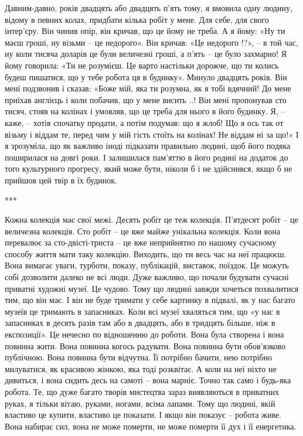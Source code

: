 Давним-давно, років двадцять або двадцять п'ять тому, я вмовила одну людину,
відому в певних колах, придбати кілька робіт у мене. Для себе, для свого
інтер'єру. Він чинив опір, він кричав, що це йому не треба. А я йому: «Ну ти
маєш гроші, ну візьми – це недорого». Він кричав: «Це недорого !?», – в той
час, ну коли тисяча доларів це були величезні гроші, а п'ять – це було
захмарно! Я йому говорила: «Ти не розумієш. Це варто настільки дорожче, що ти
колись будеш пишатися, що у тебе робота ця в будинку». Минуло двадцять років.
Він мені подзвонив і сказав: «Боже мій, яка ти розумна, як я тобі вдячний! До
мене приїхав англієць і коли побачив, що у мене висить ..! Він мені пропонував
сто тисяч, стояв на колінах і умовляв, що це треба для нього в його будинку. Я,
– каже, – хотів спочатку продати, а потім подумав: що я жлоб! Що я ось так от
візьму і віддам те, перед чим у мій гість стоїть на колінах! Не віддам ні за
що!» І я зрозуміла, що як важливо іноді підказати правильно людині, щоб його
подяка поширилася на довгі роки. І залишилася пам'яттю в його родині на додаток
до того культурного прогресу, який може бути, ніколи б і не здійснився, якщо б
не прийшов цей твір в їх будинок.

***

Кожна колекція має свої межі. Десять робіт це теж колекція. П'ятдесят робіт –
це величезна колекція. Сто робіт – це вже майже унікальна колекція. Коли вона
перевалює за сто-двісті-триста – це вже неприйнятно по нашому сучасному способу
життя мати таку колекцію. Виходить, що ти весь час на неї працюєш. Вона вимагає
уваги, турботи, показу, публікацій, виставок, поїздок. Це можуть собі дозволити
далеко не всі люди. Дуже важливо, що почали будувати сучасні приватні художні
музеї. Це чудово. Тому що людині завжди хочеться похвалитися тим, що він має. І
він не буде тримати у себе картинку в підвалі, як у нас багато музеїв це
тримають в запасниках. Коли всі музеї хваляться тим, що «у нас в запасниках в
десять разів там або в двадцять, або в тридцять більше, ніж в експозиції». Це
нечесно по відношенню до роботи. Вона була створена і вона повинна жити. Вона
повинна когось радувати. Вона повинна бути обов'язково публічною. Вона повинна
бути відчутна. Її потрібно бачити, нею потрібно милуватися, як красивою жінкою,
яка тоді розквітає. А коли на неї ніхто не дивиться, і вона сидить десь на
самоті – вона марніє. Точно так само і будь-яка робота. Те, що дуже багато
творів мистецтва зараз виявляються в приватних руках, я тільки вітаю, руками,
ногами, всіма лапами. Тому що людині, якій властиво це купити, властиво це
показати. І якщо він показує – робота живе. Вона набирає сил, вона не може
померти, не може померти її дух і її енергетика. 

